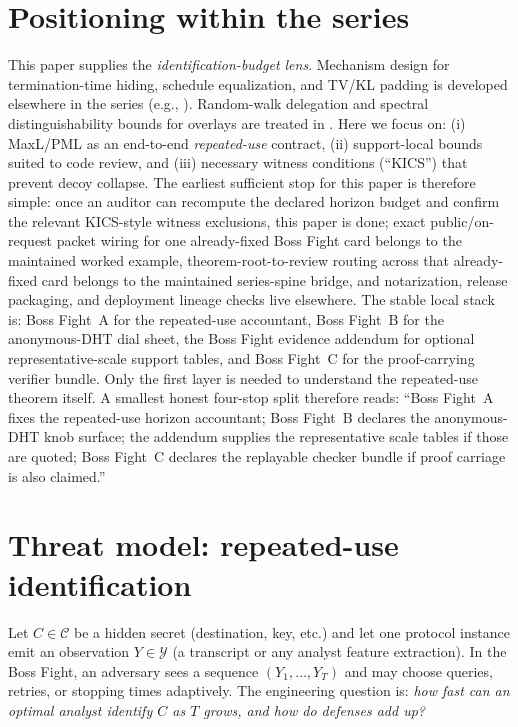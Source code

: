 \documentclass[11pt]{article}
\newcommand{\C}{\mathcal{C}} %
\newcommand{\Y}{\mathcal{Y}} %
\begin{document}
\section{Positioning within the series}\label{sec:series}
This paper supplies the \emph{identification-budget lens}.
Mechanism design for termination-time hiding, schedule equalization, and TV/KL padding is developed elsewhere in the series
(e.g., \cite{series:schedcompiler,series:knapsacktransport,series:prefixcapacities,series:manytestinglowerbounds,series:stoptimeaddendum}).
Random-walk delegation and spectral distinguishability bounds for overlays are treated in \cite{series:spectral}.
Here we focus on:
(i) MaxL/PML as an end-to-end \emph{repeated-use} contract,
(ii) support-local bounds suited to code review, and
(iii) necessary witness conditions (``KICS'') that prevent decoy collapse.
The earliest sufficient stop for this paper is therefore simple: once an auditor can recompute the declared horizon budget and confirm the relevant KICS-style witness exclusions, this paper is done; exact public/on-request packet wiring for one already-fixed Boss Fight card belongs to the maintained worked example, theorem-root-to-review routing across that already-fixed card belongs to the maintained series-spine bridge, and notarization, release packaging, and deployment lineage checks live elsewhere.\cite{series:workedexample,series:seriesspines,series:evalnotary,series:abomoinl,series:releaseproperty}
The stable local stack is: Boss Fight~A for the repeated-use accountant, Boss Fight~B for the anonymous-DHT dial sheet, the Boss Fight evidence addendum for optional representative-scale support tables, and Boss Fight~C for the proof-carrying verifier bundle.
Only the first layer is needed to understand the repeated-use theorem itself.
A smallest honest four-stop split therefore reads: ``Boss Fight~A fixes the repeated-use horizon accountant; Boss Fight~B declares the anonymous-DHT knob surface; the addendum supplies the representative scale tables if those are quoted; Boss Fight~C declares the replayable checker bundle if proof carriage is also claimed.''

\section{Threat model: repeated-use identification}\label{sec:bossfight}
Let $C\in\C$ be a hidden secret (destination, key, etc.) and let one protocol instance emit an observation $Y\in\Y$ (a transcript or any analyst feature extraction).
In the Boss Fight, an adversary sees a sequence $(Y_1,\dots,Y_T)$ and may choose queries, retries, or stopping times adaptively.
The engineering question is: \emph{how fast can an optimal analyst identify $C$ as $T$ grows, and how do defenses add up?}
\end{document}
